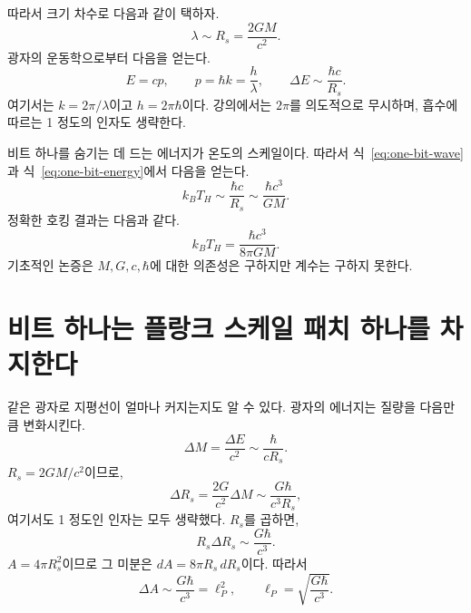 따라서 크기 차수로 다음과 같이 택하자.
\begin{equation}
\lambda\sim R_s=\frac{2GM}{c^2}.
\label{eq:one-bit-wave}
\end{equation}
광자의 운동학으로부터 다음을 얻는다.
\begin{equation}
E=cp,
\qquad
p=\hbar k=\frac{h}{\lambda},
\qquad
\Delta E\sim\frac{\hbar c}{R_s}.
\label{eq:one-bit-energy}
\end{equation}
여기서는 \(k=2\pi/\lambda\)이고 \(h=2\pi\hbar\)이다. 강의에서는 \(2\pi\)를 의도적으로 무시하며, 흡수에 따르는 1 정도의 인자도 생략한다.

\begin{classroomqa}\end{classroomqa}

비트 하나를 숨기는 데 드는 에너지가 온도의 스케일이다. 따라서 식~\eqref{eq:one-bit-wave}과 식~\eqref{eq:one-bit-energy}에서 다음을 얻는다.
\begin{equation}
k_BT_H\sim\frac{\hbar c}{R_s}
\sim\frac{\hbar c^3}{GM}.
\end{equation}
정확한 호킹 결과는 다음과 같다.
\begin{equation}
k_BT_H=\frac{\hbar c^3}{8\pi GM}.
\end{equation}
기초적인 논증은 \(M,G,c,\hbar\)에 대한 의존성은 구하지만 계수는 구하지 못한다.

\section{비트 하나는 플랑크 스케일 패치 하나를 차지한다}

같은 광자로 지평선이 얼마나 커지는지도 알 수 있다. 광자의 에너지는 질량을 다음만큼 변화시킨다.
\begin{equation}
\Delta M=\frac{\Delta E}{c^2}
\sim\frac{\hbar}{cR_s}.
\end{equation}
\(R_s=2GM/c^2\)이므로,
\begin{equation}
\Delta R_s=\frac{2G}{c^2}\Delta M
\sim\frac{G\hbar}{c^3R_s},
\end{equation}
여기서도 1 정도인 인자는 모두 생략했다. \(R_s\)를 곱하면,
\begin{equation}
R_s\Delta R_s\sim\frac{G\hbar}{c^3}.
\end{equation}
\(A=4\pi R_s^2\)이므로 그 미분은 \(dA=8\pi R_s\,dR_s\)이다. 따라서
\begin{equation}
\Delta A\sim\frac{G\hbar}{c^3}=\ell_P^2,
\qquad
\ell_P=\sqrt{\frac{G\hbar}{c^3}}.
\label{eq:planck-patch}
\end{equation}

